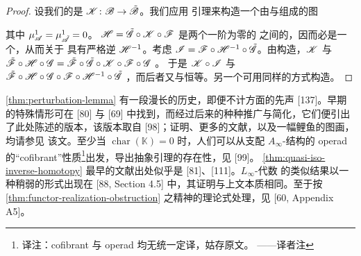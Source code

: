 \begin{proof}
设我们的\trQuasiisomorphism{}是 $\mathscr{K}\colon\mathscr{B}\to\tilde{\mathscr{B}}$。我们应用%
\trPerturbation{}引理来构造一个由\trNonunital{}\trACategory{}与\trQuasiisomorphism{}组成的图
其中 $\mu^1_{\mathscr{A}}=\mu^1_{\tilde{\mathscr{A}}}=0$。\trComposition{}%
$\mathscr{H}=\tilde{\mathscr{G}}\circ\mathscr{K}\circ\mathscr{F}$ 是两个一阶\trComposition{}为零的%
\trACategory{}之间的\trQuasiisomorphism，因而必是一个\trFormalDiffeomorphism，从而关于%
\trComposition{}具有严格逆 $\mathscr{H}^{-1}$。考虑
$\mathscr{I}=\mathscr{F}\circ\mathscr{H}^{-1}\circ\tilde{\mathscr{G}}$。由构造，$\mathscr{K}$ 与
$\tilde{\mathscr{F}}\circ\mathscr{H}\circ\mathscr{G}
=\tilde{\mathscr{F}}\circ\tilde{\mathscr{G}}\circ\mathscr{K}\circ\mathscr{F}\circ\mathscr{G}$ \trHomotopic。
于是 $\mathscr{K}\circ\mathscr{I}$ 与
$\tilde{\mathscr{F}}\circ\mathscr{H}\circ\mathscr{G}\circ\mathscr{F}\circ\mathscr{H}^{-1}\circ\tilde{\mathscr{G}}$
\trHomotopic，而后者又与恒等\trHomotopic。另一个\trHomotopy{}可用同样的方式构造。
\end{proof}

\begin{remark}\label{thm:perturbation-lemma-history}
\cref{thm:perturbation-lemma} 有一段漫长的历史，即便不计\trTopology{}方面的先声
[137]。早期的特殊情形可在 [80] 与 [69] 中找到，而经过后来的种种推广与简化，它们便引出
了此处陈述的版本，该版本取自 [98]；证明、更多的文献，以及一幅鲤鱼的图画，均请参见
该文。至少当 $\operatorname{char}(\mathbb{K})=0$ 时，人们可以从支配 $A_\infty$-结构的
operad 的“cofibrant”性质\footnote{译注：cofibrant 与 operad 均无统一定译，姑存原文。
——译者注}出发，导出抽象\trPerturbation{}引理的存在性，见 [99]。
\cref{thm:quasi-iso-inverse-homotopy} 最早的文献出处似乎是 [81]、[111]。$L_\infty$-代数
的类似结果以一种稍弱的形式出现在 [88, Section 4.5] 中，其证明与上文本质相同。至于按
\cref{thm:functor-realization-obstruction} 之精神的\trObstruction{}理论式处理，见
[60, Appendix A5]。
\end{remark}
